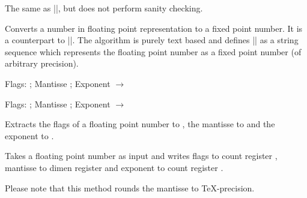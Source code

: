 \begin{command}{\pgfmathfloatqparsenumber{}}
	The same as |\pgfmathfloatparsenumber|, but does not perform sanity checking.
\end{command}

\begin{command}{}
	Converts a number in floating point representation to a fixed point number. It is a counterpart to |\pgfmathfloatparsenumber|. The algorithm is purely text based and defines |\pgfmathresult| as a string sequence which represents the floating point number  as a fixed point number (of arbitrary precision).

\begin{codeexample}[]
\pgfmathfloattomacro{\pgfmathresult}{\F}{\M}{\E}
Flags: \F; Mantisse \M; Exponent \E
$\to$ 
\pgfmathfloattofixed{\pgfmathresult}
\pgfmathresult
\end{codeexample}

\begin{codeexample}[]
\pgfmathfloattomacro{\pgfmathresult}{\F}{\M}{\E}
Flags: \F; Mantisse \M; Exponent \E
$\to$
\pgfmathfloattofixed{\pgfmathresult}
\pgfmathresult 
\end{codeexample}
\end{command}


\begin{command}{}
	Extracts the flags of a floating point number  to , the mantisse to  and the exponent to .
\end{command}

\begin{command}{}
	Takes a floating point number  as input and writes flags to count
	register , mantisse to dimen register  and exponent to count
	register .

	Please note that this method rounds the mantisse to \TeX-precision.
\end{command}

